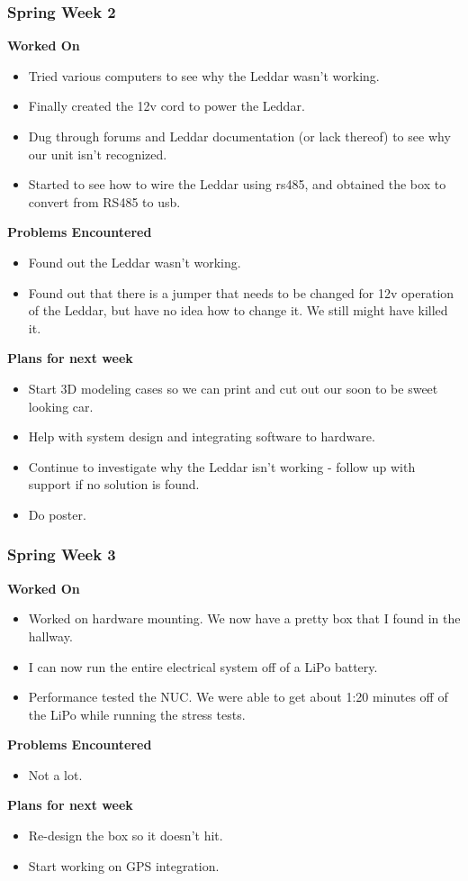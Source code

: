 \documentclass[compsoc,draftclsnofoot,onecolumn,10pt]{IEEEtran}
\begin{document}
\subsubsection*{Spring Week 2}
\textbf{Worked On}
\begin{itemize}
    \item Tried various computers to see why the Leddar wasn't working.
    \item Finally created the 12v cord to power the Leddar.
    \item Dug through forums and Leddar documentation (or lack thereof) to see why our unit isn't recognized.
    \item Started to see how to wire the Leddar using rs485, and obtained the box to convert from RS485 to usb.
\end{itemize}
\textbf{Problems Encountered}
\begin{itemize}
    \item Found out the Leddar wasn't working.
    \item Found out that there is a jumper that needs to be changed for 12v operation of the Leddar, but have no idea how to change it. We still might have killed it. 
\end{itemize}
\textbf{Plans for next week}
\begin{itemize}
    \item Start 3D modeling cases so we can print and cut out our soon to be sweet looking car.
    \item Help with system design and integrating software to hardware.
    \item Continue to investigate why the Leddar isn't working - follow up with support if no solution is found. 
    \item Do poster.
\end{itemize}


\subsubsection*{Spring Week 3}
\textbf{Worked On}
\begin{itemize}
    \item Worked on hardware mounting. We now have a pretty box that I found in the hallway. 
    \item I can now run the entire electrical system off of a LiPo battery.
    \item Performance tested the NUC. We were able to get about 1:20 minutes off of the LiPo while running the stress tests.
\end{itemize}
\textbf{Problems Encountered}
\begin{itemize}
    \item Not a lot.
\end{itemize}
\textbf{Plans for next week}
\begin{itemize}
    \item Re-design the box so it doesn't hit.
    \item Start working on GPS integration.
\end{itemize}
\end{document}
